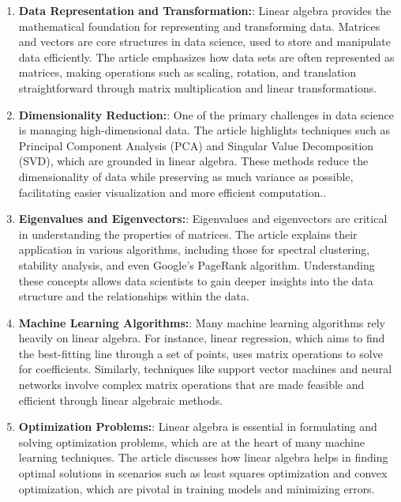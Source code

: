 \documentclass{article}
\begin{document}
\begin{enumerate}
    \item \textbf{Data Representation and Transformation:}: 
    Linear algebra provides the mathematical foundation for representing and transforming data. Matrices and vectors are core structures in data science, used to store and manipulate data efficiently. The article emphasizes how data sets are often represented as matrices, making operations such as scaling, rotation, and translation straightforward through matrix multiplication and linear transformations.

    \item \textbf{Dimensionality Reduction:}: One of the primary challenges in data science is managing high-dimensional data. The article highlights techniques such as Principal Component Analysis (PCA) and Singular Value Decomposition (SVD), which are grounded in linear algebra. These methods reduce the dimensionality of data while preserving as much variance as possible, facilitating easier visualization and more efficient computation..

    \item \textbf{Eigenvalues and Eigenvectors:}: Eigenvalues and eigenvectors are critical in understanding the properties of matrices. The article explains their application in various algorithms, including those for spectral clustering, stability analysis, and even Google's PageRank algorithm. Understanding these concepts allows data scientists to gain deeper insights into the data structure and the relationships within the data.

    \item \textbf{Machine Learning Algorithms:}: Many machine learning algorithms rely heavily on linear algebra. For instance, linear regression, which aims to find the best-fitting line through a set of points, uses matrix operations to solve for coefficients. Similarly, techniques like support vector machines and neural networks involve complex matrix operations that are made feasible and efficient through linear algebraic methods.

    \item \textbf{Optimization Problems:}: Linear algebra is essential in formulating and solving optimization problems, which are at the heart of many machine learning techniques. The article discusses how linear algebra helps in finding optimal solutions in scenarios such as least squares optimization and convex optimization, which are pivotal in training models and minimizing errors.


\end{enumerate}
\end{document}
